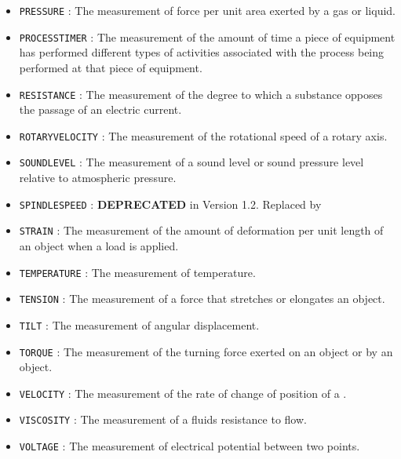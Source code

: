 \begin{itemize}
\item \texttt{PRESSURE} : The measurement of force per unit area exerted by a gas or liquid. 

\item \texttt{PROCESS\textunderscore TIMER} : The measurement of the amount of time a piece of equipment has performed different types of activities associated with the process being performed at that piece of equipment. 

\item \texttt{RESISTANCE} : The measurement of the degree to which a substance opposes the passage of an electric current. 

\item \texttt{ROTARY\textunderscore VELOCITY} : The measurement of the rotational speed of a rotary axis. 

\item \texttt{SOUND\textunderscore LEVEL} : The measurement of a sound level or sound pressure level relative to atmospheric pressure. 

\item \texttt{SPINDLE\textunderscore SPEED} : \textbf{DEPRECATED} in Version 1.2.  Replaced by  

\item \texttt{STRAIN} : The measurement of the amount of deformation per unit length of an object when a load is applied. 

\item \texttt{TEMPERATURE} : The measurement of temperature. 

\item \texttt{TENSION} : The measurement of a force that stretches or elongates an object. 

\item \texttt{TILT} : The measurement of angular displacement. 

\item \texttt{TORQUE} : The measurement of the turning force exerted on an object or by an object. 

\item \texttt{VELOCITY} : The measurement of the rate of change of position of a . 

\item \texttt{VISCOSITY} : The measurement of a fluids resistance to flow. 

\item \texttt{VOLTAGE} : The measurement of electrical potential between two points. 


\end{itemize}
